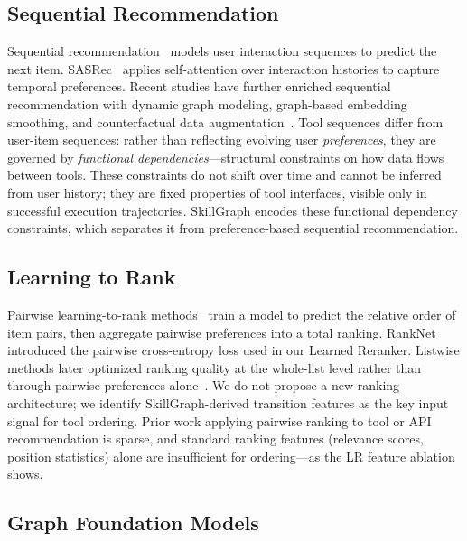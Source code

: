 \documentclass[lettersize,journal]{IEEEtran}
\begin{document}
\subsection{Sequential Recommendation}

Sequential recommendation~\cite{sasrec} models user interaction sequences to predict the next item.
SASRec~\cite{sasrec} applies self-attention over interaction histories to capture temporal preferences.
Recent studies have further enriched sequential recommendation with dynamic graph modeling, graph-based embedding smoothing, and counterfactual data augmentation~\cite{dgnn_seqrec_tkde,gbes_seqrec_tkde,cf_seqrec_tkde}.
Tool sequences differ from user-item sequences: rather than reflecting evolving user \emph{preferences}, they are governed by \emph{functional dependencies}---structural constraints on how data flows between tools.
These constraints do not shift over time and cannot be inferred from user history; they are fixed properties of tool interfaces, visible only in successful execution trajectories.
SkillGraph encodes these functional dependency constraints, which separates it from preference-based sequential recommendation.

\subsection{Learning to Rank}

Pairwise learning-to-rank methods~\cite{ranknet} train a model to predict the relative order of item pairs, then aggregate pairwise preferences into a total ranking.
RankNet~\cite{ranknet} introduced the pairwise cross-entropy loss used in our Learned Reranker.
Listwise methods later optimized ranking quality at the whole-list level rather than through pairwise preferences alone~\cite{listwise}.
We do not propose a new ranking architecture; we identify SkillGraph-derived transition features as the key input signal for tool ordering.
Prior work applying pairwise ranking to tool or API recommendation is sparse, and standard ranking features (relevance scores, position statistics) alone are insufficient for ordering---as the LR feature ablation shows.

\subsection{Graph Foundation Models}
\end{document}
